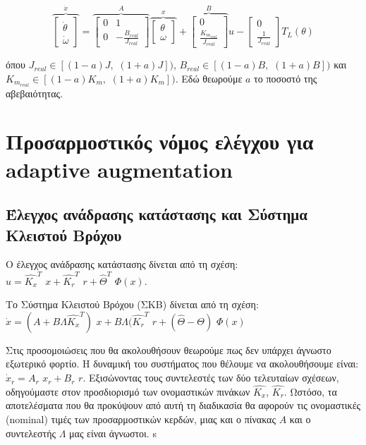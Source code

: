 \documentclass{article}
\begin{document}
    \begin{equation}
        \overbrace{\begin{bmatrix}
            \dot{\theta} \\
            \dot{\omega}
        \end{bmatrix}}^{\dot{x}} = 
        \overbrace{
        \begin{bmatrix}
            0 & 1 \\
            0 & -\frac{B_{real}}{J_{real}}
        \end{bmatrix}}^{A}
        \overbrace{
        \begin{bmatrix}
            \theta \\
            \omega
        \end{bmatrix}}^{x} + 
        \overbrace{
        \begin{bmatrix}
             0 \\ 
            \frac{K_{m_{real}}}{J_{real}}
        \end{bmatrix}}^{B} u - 
        \begin{bmatrix}
             0 \\ 
            \frac{1}{J_{real}}
        \end{bmatrix} T_L(\theta)
    \end{equation}
    
    \hfill\break
    όπου \(J_{real} \in [(1 - a) J,\,\,(1 + a) J])\), \(B_{real} \in [(1 - a) B,\,\,(1 + a) B])\) και \(K_{m_{real}} \in [(1 - a) K_m,\,\,(1 + a) K_m])\). Εδώ θεωρούμε \(a\) το ποσοστό της αβεβαιότητας.
    
    \section{Προσαρμοστικός νόμος ελέγχου για adaptive augmentation}
    \subsection{Έλεγχος ανάδρασης κατάστασης και Σύστημα Κλειστού Βρόχου}
    Ο έλεγχος ανάδρασης κατάστασης δίνεται από τη σχέση: \(u = \hat{K_x}^T\,\,x + \hat{K_r}^T\,\,r + \hat{\Theta}^T\,\,Φ(x)\).
    
    \hfill\break
    Το Σύστημα Κλειστού Βρόχου (ΣΚΒ) δίνεται από τη σχέση: \(\dot{x} = (A + B \Lambda \hat{K_x}^T)\,\,x + B\Lambda(\hat{K_r}^T\,\,r + (\hat{\Theta} - \Theta)\,\,Φ(x)\)
    
    \hfill\break
    Στις προσομοιώσεις που θα ακολουθήσουν θεωρούμε πως δεν υπάρχει άγνωστο εξωτερικό φορτίο. Η δυναμική του συστήματος που θέλουμε να ακολουθήσουμε είναι: \(\dot{x}_r = A_r\,\,x_r + B_r\,\,r\). Εξισώνοντας τους συντελεστές των δύο τελευταίων σχέσεων, οδηγούμαστε στον προσδιορισμό των ονομαστικών πινάκων \(\hat{K_x}\), \(\hat{K_r}\). Ωστόσο, τα αποτελέσματα που θα προκύψουν από αυτή τη διαδικασία θα αφορούν τις ονομαστικές (nominal) τιμές των προσαρμοστικών κερδών, μιας και ο πίνακας \(A\) και ο συντελεστής \(\Lambda\) μας είναι άγνωστοι.
    s
\end{document}
